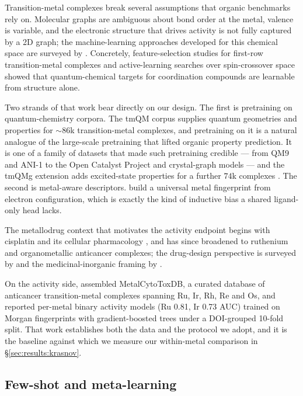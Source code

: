 Transition-metal complexes break several assumptions that organic benchmarks
rely on. Molecular graphs are ambiguous about bond order at the metal, valence
is variable, and the electronic structure that drives activity is not fully
captured by a 2D graph; the machine-learning approaches developed for this
chemical space are surveyed by \citet{nandy2021computational}. Concretely,
feature-selection studies for first-row transition-metal complexes
\citep{janet2017} and active-learning searches over spin-crossover space
\citep{janet2018} showed that quantum-chemical targets for coordination
compounds are learnable from structure alone.

Two strands of that work bear directly on our design. The first is pretraining
on quantum-chemistry corpora. The tmQM corpus \citep{tmqm2020} supplies quantum
geometries and properties for $\sim$86k transition-metal complexes, and
pretraining on it is a natural analogue of the large-scale pretraining that
lifted organic property prediction. It is one of a family of datasets that made
such pretraining credible --- from QM9 \citep{qm9} and ANI-1 \citep{ani1} to the
Open Catalyst Project \citep{opencatalyst2021} and crystal-graph models
\citep{cgcnn2018} --- and the tmQMg extension adds excited-state properties for
a further $74$k complexes \citep{tmqmg2025}. The second is metal-aware
descriptors. \citet{electrum2025} build a universal metal fingerprint from
electron configuration, which is exactly the kind of inductive bias a shared
ligand-only head lacks.

The metallodrug context that motivates the activity endpoint begins with
cisplatin \citep{rosenberg1969} and its cellular pharmacology
\citep{lippard2005}, and has since broadened to ruthenium \citep{alessio2007}
and organometallic \citep{zhangsadler2017} anticancer complexes; the drug-design
perspective is surveyed by \citet{ndagi2017} and the medicinal-inorganic framing
by \citet{mjos2014metallodrugs}.

On the activity side, \citet{krasnov2026metalcytotoxdb} assembled
MetalCytoToxDB, a curated database of anticancer transition-metal complexes
spanning Ru, Ir, Rh, Re and Os, and reported per-metal binary activity models
(Ru 0.81, Ir 0.73 AUC) trained on Morgan fingerprints with gradient-boosted
trees under a DOI-grouped 10-fold split. That work establishes both the data and
the protocol we adopt, and it is the baseline against which we measure our
within-metal comparison in \S\ref{sec:results:krasnov}.

\subsection{Few-shot and meta-learning}

